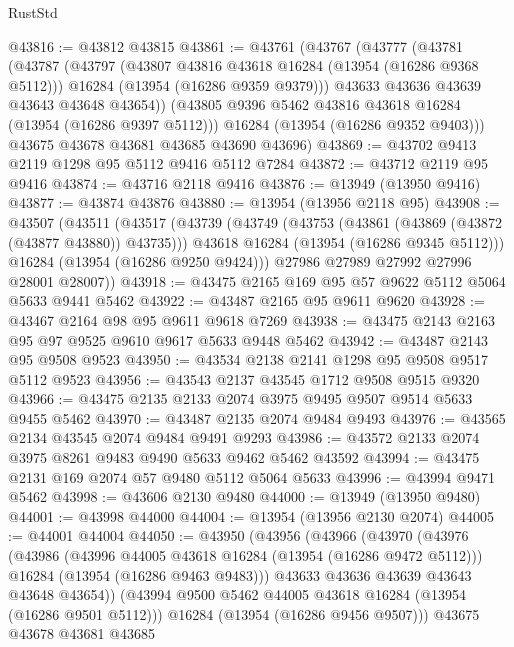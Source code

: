 \begin{lexlean}{RustStd}
\begin{coremodule}
@43816 := @43812 @43815
@43861 := @43761
    (@43767
      (@43777
        (@43781
          (@43787
            (@43797
              (@43807 @43816 @43618 @16284 (@13954 (@16286 @9368 @5112)))
              @16284
              (@13954 (@16286 @9359 @9379)))
            @43633
            @43636
            @43639
            @43643
            @43648
            @43654))
        (@43805 @9396 @5462 @43816 @43618 @16284 (@13954 (@16286 @9397 @5112)))
        @16284
        (@13954 (@16286 @9352 @9403)))
      @43675
      @43678
      @43681
      @43685
      @43690
      @43696)
@43869 := @43702 @9413 @2119 @1298 @95 @5112 @9416 @5112 @7284
@43872 := @43712 @2119 @95 @9416
@43874 := @43716 @2118 @9416
@43876 := @13949 (@13950 @9416)
@43877 := @43874 @43876
@43880 := @13954 (@13956 @2118 @95)
@43908 := @43507
    (@43511
      (@43517
        (@43739
          (@43749
            (@43753 (@43861 (@43869 (@43872 (@43877 @43880)) @43735)))
            @43618
            @16284
            (@13954 (@16286 @9345 @5112)))
          @16284
          (@13954 (@16286 @9250 @9424)))
        @27986
        @27989
        @27992
        @27996
        @28001
        @28007))
@43918 := @43475 @2165 @169 @95 @57 @9622 @5112 @5064 @5633 @9441 @5462
@43922 := @43487 @2165 @95 @9611 @9620
@43928 := @43467 @2164 @98 @95 @9611 @9618 @7269
@43938 := @43475 @2143 @2163 @95 @97 @9525 @9610 @9617 @5633 @9448 @5462
@43942 := @43487 @2143 @95 @9508 @9523
@43950 := @43534 @2138 @2141 @1298 @95 @9508 @9517 @5112 @9523
@43956 := @43543 @2137 @43545 @1712 @9508 @9515 @9320
@43966 := @43475 @2135 @2133 @2074 @3975 @9495 @9507 @9514 @5633 @9455 @5462
@43970 := @43487 @2135 @2074 @9484 @9493
@43976 := @43565 @2134 @43545 @2074 @9484 @9491 @9293
@43986 := @43572 @2133 @2074 @3975 @8261 @9483 @9490 @5633 @9462 @5462 @43592
@43994 := @43475 @2131 @169 @2074 @57 @9480 @5112 @5064 @5633
@43996 := @43994 @9471 @5462
@43998 := @43606 @2130 @9480
@44000 := @13949 (@13950 @9480)
@44001 := @43998 @44000
@44004 := @13954 (@13956 @2130 @2074)
@44005 := @44001 @44004
@44050 := @43950
    (@43956
      (@43966
        (@43970
          (@43976
            (@43986
              (@43996 @44005 @43618 @16284 (@13954 (@16286 @9472 @5112)))
              @16284
              (@13954 (@16286 @9463 @9483)))
            @43633
            @43636
            @43639
            @43643
            @43648
            @43654))
        (@43994 @9500 @5462 @44005 @43618 @16284 (@13954 (@16286 @9501 @5112)))
        @16284
        (@13954 (@16286 @9456 @9507)))
      @43675
      @43678
      @43681
      @43685

\end{coremodule}
\end{lexlean}
